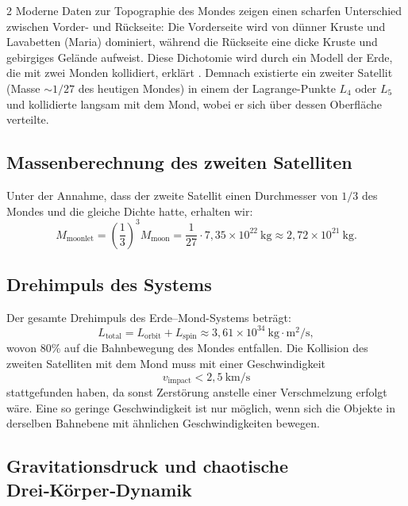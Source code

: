 \documentclass[11pt,a4paper]{article}
\begin{document}
\begin{multicols}{2}
		Moderne Daten zur Topographie des Mondes zeigen einen scharfen Unterschied zwischen Vorder- und Rückseite: Die Vorderseite wird von dünner Kruste und Lavabetten (Maria) dominiert, während die Rückseite eine dicke Kruste und gebirgiges Gelände aufweist. Diese Dichotomie wird durch ein Modell der Erde, die mit zwei Monden kollidiert, erklärt \cite{JutziAsphaug2011}. Demnach existierte ein zweiter Satellit (Masse \(\sim 1/27\) des heutigen Mondes) in einem der Lagrange-Punkte \(L_4\) oder \(L_5\) und kollidierte langsam mit dem Mond, wobei er sich über dessen Oberfläche verteilte.
		
		\subsection{Massenberechnung des zweiten Satelliten}
		
		Unter der Annahme, dass der zweite Satellit einen Durchmesser von \(1/3\) des Mondes und die gleiche Dichte hatte, erhalten wir:
		{\small
			\[
			M_{\text{moonlet}} = \left(\frac{1}{3}\right)^3 M_{\text{moon}} = \frac{1}{27} \cdot 7,35 \times 10^{22}\ \text{kg} \approx 2,72 \times 10^{21}\ \text{kg}.
			\]}
		
		\subsection{Drehimpuls des Systems}
		
		Der gesamte Drehimpuls des Erde–Mond-Systems beträgt:
		\[
		L_{\text{total}} = L_{\text{orbit}} + L_{\text{spin}} \approx 3,61 \times 10^{34}\ \text{kg}\cdot\text{m}^2/\text{s},
		\]
		wovon 80\% auf die Bahnbewegung des Mondes entfallen. Die Kollision des zweiten Satelliten mit dem Mond muss mit einer Geschwindigkeit
		\[
		v_{\text{impact}} < 2,5\ \text{km/s}
		\]
		stattgefunden haben, da sonst Zerstörung anstelle einer Verschmelzung erfolgt wäre. Eine so geringe Geschwindigkeit ist nur möglich, wenn sich die Objekte in derselben Bahnebene mit ähnlichen Geschwindigkeiten bewegen.
		
		\subsection{Gravitationsdruck und chaotische Drei‑Körper‑Dynamik}
		

\end{multicols}
\end{document}
